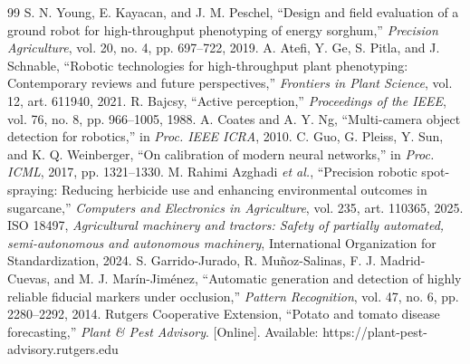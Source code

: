 \documentclass[conference]{IEEEtran}
\begin{document}
\begin{thebibliography}{99}
 S. N. Young, E. Kayacan, and J. M. Peschel, ``Design and field evaluation of a ground robot for high-throughput phenotyping of energy sorghum,'' \emph{Precision Agriculture}, vol. 20, no. 4, pp. 697--722, 2019.
 A. Atefi, Y. Ge, S. Pitla, and J. Schnable, ``Robotic technologies for high-throughput plant phenotyping: Contemporary reviews and future perspectives,'' \emph{Frontiers in Plant Science}, vol. 12, art. 611940, 2021.
 R. Bajcsy, ``Active perception,'' \emph{Proceedings of the IEEE}, vol. 76, no. 8, pp. 966--1005, 1988.
 A. Coates and A. Y. Ng, ``Multi-camera object detection for robotics,'' in \emph{Proc. IEEE ICRA}, 2010.
 C. Guo, G. Pleiss, Y. Sun, and K. Q. Weinberger, ``On calibration of modern neural networks,'' in \emph{Proc. ICML}, 2017, pp. 1321--1330.
 M. Rahimi Azghadi \emph{et al.}, ``Precision robotic spot-spraying: Reducing herbicide use and enhancing environmental outcomes in sugarcane,'' \emph{Computers and Electronics in Agriculture}, vol. 235, art. 110365, 2025.
 ISO 18497, \emph{Agricultural machinery and tractors: Safety of partially automated, semi-autonomous and autonomous machinery}, International Organization for Standardization, 2024.
 S. Garrido-Jurado, R. Muñoz-Salinas, F. J. Madrid-Cuevas, and M. J. Marín-Jiménez, ``Automatic generation and detection of highly reliable fiducial markers under occlusion,'' \emph{Pattern Recognition}, vol. 47, no. 6, pp. 2280--2292, 2014.
 Rutgers Cooperative Extension, ``Potato and tomato disease forecasting,'' \emph{Plant \& Pest Advisory}. [Online]. Available: https://plant-pest-advisory.rutgers.edu
\end{thebibliography}
\end{document}
